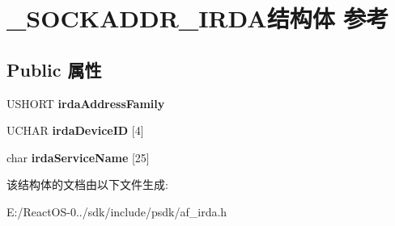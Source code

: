 \hypertarget{struct___s_o_c_k_a_d_d_r___i_r_d_a}{}\section{\+\_\+\+S\+O\+C\+K\+A\+D\+D\+R\+\_\+\+I\+R\+D\+A结构体 参考}
\label{struct___s_o_c_k_a_d_d_r___i_r_d_a}
\subsection*{Public 属性}
\begin{DoxyCompactItemize}
\item 
\mbox{\label{struct___s_o_c_k_a_d_d_r___i_r_d_a_a25e96e534a0a58eda08605251807846c}} 
U\+S\+H\+O\+RT {\bfseries irda\+Address\+Family}
\item 
\mbox{\label{struct___s_o_c_k_a_d_d_r___i_r_d_a_a14b8b3f96c379b9ecae06e55bbdfa1db}} 
U\+C\+H\+AR {\bfseries irda\+Device\+ID} \mbox{[}4\mbox{]}
\item 
\mbox{\label{struct___s_o_c_k_a_d_d_r___i_r_d_a_ae7aad50e15c78fafc216bac60abdb055}} 
char {\bfseries irda\+Service\+Name} \mbox{[}25\mbox{]}
\end{DoxyCompactItemize}


该结构体的文档由以下文件生成\+:\begin{DoxyCompactItemize}
\item 
E\+:/\+React\+O\+S-\/0../sdk/include/psdk/af\+\_\+irda.\+h\end{DoxyCompactItemize}
